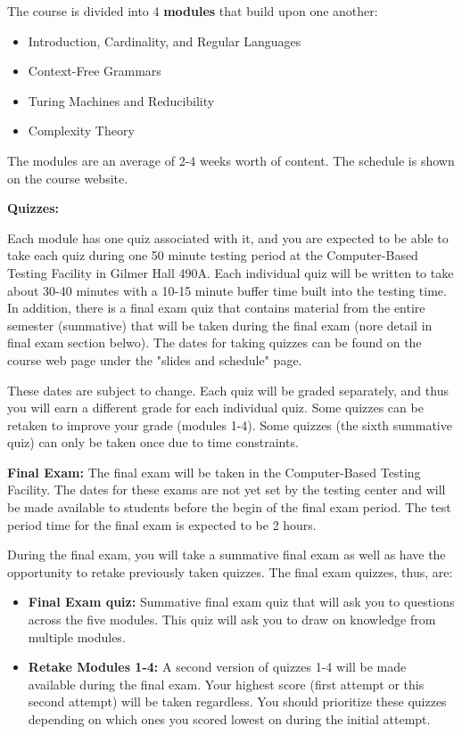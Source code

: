 \documentclass[12pt]{article}
\begin{document}
The course is divided into 4 {\bf modules} that build upon one another:
\begin{itemize}
    \item Introduction, Cardinality, and Regular Languages
    \item Context-Free Grammars
    \item Turing Machines and Reducibility
    \item Complexity Theory
\end{itemize}
The modules are an average of 2-4 weeks worth of content. The schedule is shown on the course website. 

\textbf{Quizzes:} 

Each module has one quiz associated with it, and you are expected to be able to take each quiz during one 50 minute testing period at the Computer-Based Testing Facility in Gilmer Hall 490A. Each individual quiz will be written to take about 30-40 minutes with a 10-15 minute buffer time built into the testing time. In addition, there is a final exam quiz that contains material from the entire semester (summative) that will be taken during the final exam (nore detail in final exam section belwo). The dates for taking quizzes can be found on the course web page under the "slides and schedule" page.

These dates are subject to change. Each quiz will be graded separately, and thus you will earn a different grade for each individual quiz. Some quizzes can be retaken to improve your grade (modules 1-4). Some quizzes (the sixth summative quiz) can only be taken once due to time constraints.

\textbf{Final Exam:} The final exam will be taken in the Computer-Based Testing Facility. The dates for these exams are not yet set by the testing center and will be made available to students before the begin of the final exam period. The test period time for the final exam is expected to be 2 hours.

During the final exam, you will take a summative final exam as well as have the opportunity to retake previously taken quizzes. The final exam quizzes, thus, are:

\begin{itemize}
\item \textbf{Final Exam quiz:} Summative final exam quiz that will ask you to questions across the five modules. This quiz will ask you to draw on knowledge from multiple modules.
\item \textbf{Retake Modules 1-4:} A second version of quizzes 1-4 will be made available during the final exam. Your highest score (first attempt or this second attempt) will be taken regardless. You should prioritize these quizzes depending on which ones you scored lowest on during the initial attempt.
\end{itemize}
\end{document}
